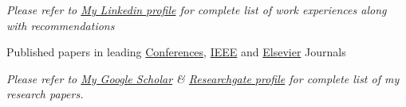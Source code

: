 \documentclass[10pt,a4paper]{article} %
\begin{document}
	
	
	
	\begin{center}
		\textit{Please refer to \href{http://www.linkedin.com/in/manu-goyal-b998a051}{My Linkedin profile} for complete list of work experiences along with recommendations}
	\end{center}
	
	
	\spacedhrule{-0.2em}{-0.4em} %
	
	
	
	
	\inlineheadsection
	{Published papers in leading \href{https://ieeexplore.ieee.org/document/8122675}{Conferences}, \href{https://ieeexplore.ieee.org/document/8456504}{IEEE} and \href{https://www.sciencedirect.com/science/article/pii/S0010482520300160?dgcid=rss_sd_all}{Elsevier} Journals}  %
	
	
	\begin{center}
		\textit{Please refer to \href{https://scholar.google.co.uk/citations?user=bYAYpskAAAAJ}{My Google Scholar} \& \href{https://www.researchgate.net/profile/Manu_Goyal9}{Researchgate profile} for complete list of my research papers. }
	\end{center}
	
	
	\spacedhrule{-0.2em}{-0.4em} %
	
	
\end{document}
